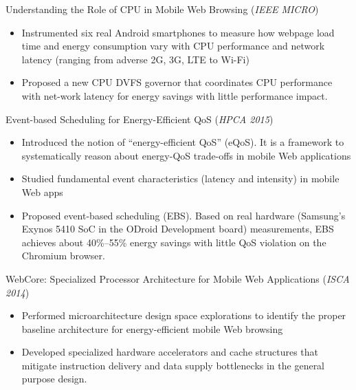 \documentclass[margin, 9pt]{res} %
\begin{document}
\begin{resume}
\medskip
Understanding the Role of CPU in Mobile Web Browsing \hfill(\textit{IEEE MICRO})\\
\vspace*{-10pt}
\begin{itemize}[leftmargin=*] \itemsep -3pt
\vspace*{-5pt}
	\item Instrumented six real Android smartphones to measure how webpage load time and energy consumption vary with CPU performance and network latency (ranging from adverse 2G, 3G, LTE to Wi-Fi)
	\item Proposed a new CPU DVFS governor that coordinates CPU performance with net-work latency for energy savings with little performance impact.
\end{itemize}

\medskip
Event-based Scheduling for Energy-Efficient QoS \hfill(\textit{HPCA 2015})\\
\vspace*{-10pt}
\begin{itemize}[leftmargin=*] \itemsep -3pt
\vspace*{-5pt}
	\item Introduced the notion of ``energy-efficient QoS'' (eQoS). It is a framework to systematically reason about energy-QoS trade-offs in mobile Web applications
	\item Studied fundamental event characteristics (latency and intensity) in mobile Web apps
	\item Proposed event-based scheduling (EBS). Based on real hardware (Samsung's Exynos 5410 SoC in the ODroid Development board) measurements, EBS achieves about 40\%--55\% energy savings with little QoS violation on the Chromium browser.
\end{itemize}

\medskip
WebCore: Specialized Processor Architecture for Mobile Web Applications \hfill(\textit{ISCA 2014})\\
\vspace*{-10pt}
\begin{itemize}[leftmargin=*] \itemsep -3pt
\vspace*{-5pt}
	\item Performed microarchitecture design space explorations to identify the proper baseline architecture for energy-efficient mobile Web browsing
	\item Developed specialized hardware accelerators and cache structures that mitigate instruction delivery and data supply bottlenecks in the general purpose design.
\end{itemize}


\end{resume}
\end{document}
